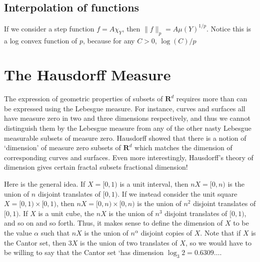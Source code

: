 \section{Interpolation of functions}

If we consider a step function $f = A \chi_Y$, then $\| f \|_p = A \mu(Y)^{1/p}$. Notice this is a log convex function of $p$, because for any $C > 0$, $\log(C)/p$

\chapter{The Hausdorff Measure}

The expression of geometric properties of subsets of $\mathbf{R}^d$ requires more than can be expressed using the Lebesgue measure. For instance, curves and surfaces all have measure zero in two and three dimensions respectively, and thus we cannot distinguish them by the Lebesgue measure from any of the other nasty Lebesgue measurable subsets of measure zero. Hausdorff showed that there is a notion of `dimension' of measure zero subsets of $\mathbf{R}^d$ which matches the dimension of corresponding curves and surfaces. Even more interestingly, Hausdorff's theory of dimension gives certain fractal subsets fractional dimension!

Here is the general idea. If $X = [0,1)$ is a unit interval, then $nX = [0,n)$ is the union of $n$ disjoint translates of $[0,1)$. If we instead consider the unit square $X = [0,1) \times [0,1)$, then $nX = [0,n) \times [0,n)$ is the union of $n^2$ disjoint translates of $[0,1)$. If $X$ is a unit cube, the $nX$ is the union of $n^3$ disjoint translates of $[0,1)$, and so on and so forth. Thus, it makes sense to define the dimension of $X$ to be the value $\alpha$ such that $nX$ is the union of $n^\alpha$ disjoint copies of $X$. Note that if $X$ is the Cantor set, then $3X$ is the union of two translates of $X$, so we would have to be willing to say that the Cantor set `has dimension $\log_3 2 = 0.6309\dots$.

